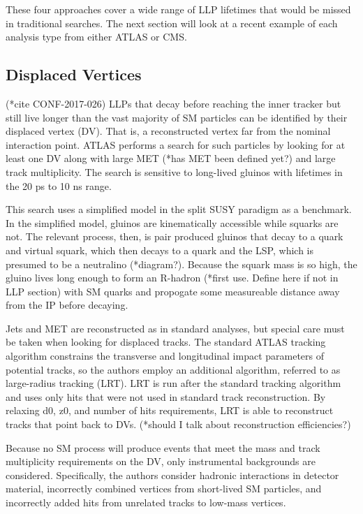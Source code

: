 \documentclass[12pt]{article}
\begin{document}
        These four approaches cover a wide range of LLP lifetimes that would be missed in traditional searches. The next section will look  at a recent example of each analysis type from either ATLAS or CMS.

\subsection{Displaced Vertices}
            (*cite CONF-2017-026)
            LLPs that decay before reaching the inner tracker but still live longer than the vast majority of SM particles can be identified by their displaced vertex (DV). That is, a reconstructed vertex far from the nominal interaction point. ATLAS performs a search for such particles by looking for at least one DV along with large MET (*has MET been defined yet?) and large track multiplicity. The search is sensitive to long-lived gluinos with lifetimes in the 20 ps to 10 ns range.

            This search uses a simplified model in the split SUSY paradigm as a benchmark. In the simplified model, gluinos are kinematically accessible while squarks are not. The relevant process, then, is pair produced gluinos that decay to a quark and virtual squark, which then decays to a quark and the LSP, which is presumed to be a neutralino (*diagram?). Because the squark mass is so high, the gluino lives long enough to form an R-hadron (*first use. Define here if not in LLP section) with SM quarks and propogate some measureable distance away from the IP before decaying. 

            Jets and MET are reconstructed as in standard analyses, but special care must be taken when looking for displaced tracks. The standard ATLAS tracking algorithm constrains the transverse and longitudinal impact parameters of potential tracks, so the authors employ an additional algorithm, referred to as large-radius tracking (LRT). LRT is run after the standard tracking algorithm and uses only hits that were not used in standard track reconstruction. By relaxing d0, z0, and number of hits requirements, LRT is able to reconstruct tracks that point back to DVs. (*should I talk about reconstruction efficiencies?)
            
            Because no SM process will produce events that meet the mass and track multiplicity requirements on the DV, only instrumental backgrounds are considered. Specifically, the authors consider hadronic interactions in detector material, incorrectly combined vertices from short-lived SM particles, and incorrectly added hits from unrelated tracks to low-mass vertices.
\end{document}
